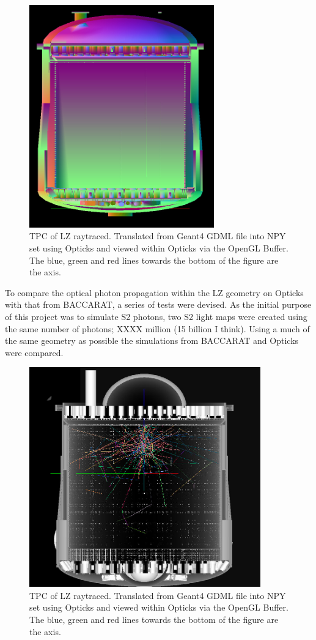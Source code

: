 \begin{figure}[!htbp]
\includegraphics[width=8cm]{Figures/Simulations/LZ_In_Opticks.png}
\centering
\caption{TPC of LZ raytraced. Translated from Geant4 GDML file into NPY set using Opticks and viewed within Opticks via the OpenGL Buffer.
The blue, green and red lines towards the bottom of the figure are the axis.}
\label{fig:OpticksLZTPC}
\end{figure}

\par
To compare the optical photon propagation within the LZ geometry on Opticks with that from BACCARAT, a series of tests were devised.
As the initial purpose of this project was to simulate S2 photons, two S2 light maps were created using the same number of photons; XXXX million (15 billion I think).
Using a much of the same geometry as possible the simulations from BACCARAT and Opticks were compared.

\begin{figure}[!htbp]
\includegraphics[width=10cm]{Figures/Simulations/LZ_S1_photons_In_Opticks.png}
\centering
\caption{TPC of LZ raytraced. Translated from Geant4 GDML file into NPY set using Opticks and viewed within Opticks via the OpenGL Buffer.
The blue, green and red lines towards the bottom of the figure are the axis.}
\label{fig:OpticksLZTPC_S1_Photons}
\end{figure}



